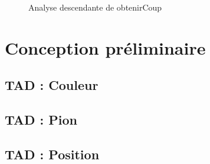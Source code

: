 \documentclass{article}
\begin{document}
\begin{figure}[H]                                                                                                                                                                                             
    \caption{Analyse descendante de obtenirCoup}                                                                                                                          
    \label{un-identifiant2}                                                                                                                                                                                 
\end{figure}       

\section{Conception préliminaire}

\subsection{TAD : Couleur}


\subsection{TAD : Pion}


\subsection{TAD : Position}

\end{document}
